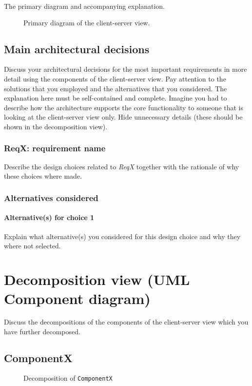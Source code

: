 \documentclass[a4paper,10pt]{article}
\begin{document}
The primary diagram and accompanying explanation.

\begin{figure}[!htp]
    \centering
    \caption{Primary diagram of the client-server view.}\label{fig:cs-primary}
\end{figure}

\subsection{Main architectural decisions}
Discuss your architectural decisions for the most important requirements in
more detail using the components of the client-server view.
Pay attention to the solutions that you employed and the alternatives that you
considered.
The explanation here must be self-contained and complete.
Imagine you had to describe how the architecture supports the core
functionality to someone that is looking at the client-server view only.
Hide unnecessary details (these should be shown in the decomposition view).

\subsubsection{ReqX\@: requirement name}
Describe the design choices related to \emph{ReqX} together with the rationale
of why these choices where made.

\subsubsection*{Alternatives considered}
\paragraph{Alternative(s) for choice 1} Explain what alternative(s) you
considered for this design choice and why they where not selected.

\section{Decomposition view (UML Component diagram)}\label{sec:decomposition}
Discuss the decompositions of the components of the client-server view which
you have further decomposed.

\subsection{ComponentX}
\begin{figure}[!htp]
    \centering
    \caption{Decomposition of \texttt{ComponentX}}\label{fig:decomp-componentx}
\end{figure}
\end{document}
